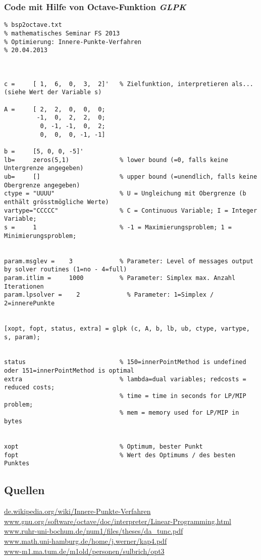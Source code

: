 \vspace{0.1cm}

\newpage
\subsubsection{Code mit Hilfe von Octave-Funktion \textit{GLPK}}

\begin{verbatim}
% bsp2octave.txt
% mathematisches Seminar FS 2013
% Optimierung: Innere-Punkte-Verfahren
% 20.04.2013



c =     [ 1,  6,  0,  3,  2]'   % Zielfunktion, interpretieren als... (siehe Wert der Variable s)

A =     [ 2,  2,  0,  0,  0;
         -1,  0,  2,  2,  0;
          0, -1, -1,  0,  2;
          0,  0,  0, -1, -1]

b =     [5, 0, 0, -5]'
lb=     zeros(5,1)              % lower bound (=0, falls keine Untergrenze angegeben)
ub=     []                      % upper bound (=unendlich, falls keine Obergrenze angegeben)
ctype = "UUUU"                  % U = Ungleichung mit Obergrenze (b enthält grösstmögliche Werte)
vartype="CCCCC"                 % C = Continuous Variable; I = Integer Variable;
s =     1                       % -1 = Maximierungsproblem; 1 = Minimierungsproblem;

        
param.msglev =    3             % Parameter: Level of messages output by solver routines (1=no - 4=full)
param.itlim =     1000          % Parameter: Simplex max. Anzahl Iterationen
param.lpsolver = 	2             % Parameter: 1=Simplex / 2=innerePunkte

          
[xopt, fopt, status, extra] = glpk (c, A, b, lb, ub, ctype, vartype, s, param);


status                          % 150=innerPointMethod is undefined oder 151=innerPointMethod is optimal
extra                           % lambda=dual variables; redcosts = reduced costs; 
                                % time = time in seconds for LP/MIP problem; 
                                % mem = memory used for LP/MIP in bytes

		
xopt                            % Optimum, bester Punkt	
fopt                            % Wert des Optimums / des besten Punktes
\end{verbatim}

\subsection{Quellen}

\url{de.wikipedia.org/wiki/Innere-Punkte-Verfahren}\\
\url{www.gnu.org/software/octave/doc/interpreter/Linear-Programming.html}\\
\url{www.ruhr-uni-bochum.de/num1/files/theses/da_tunc.pdf}\\
\url{www.math.uni-hamburg.de/home/j.werner/kap4.pdf}\\
\url{www-m1.ma.tum.de/m1old/personen/sulbrich/opt3}
